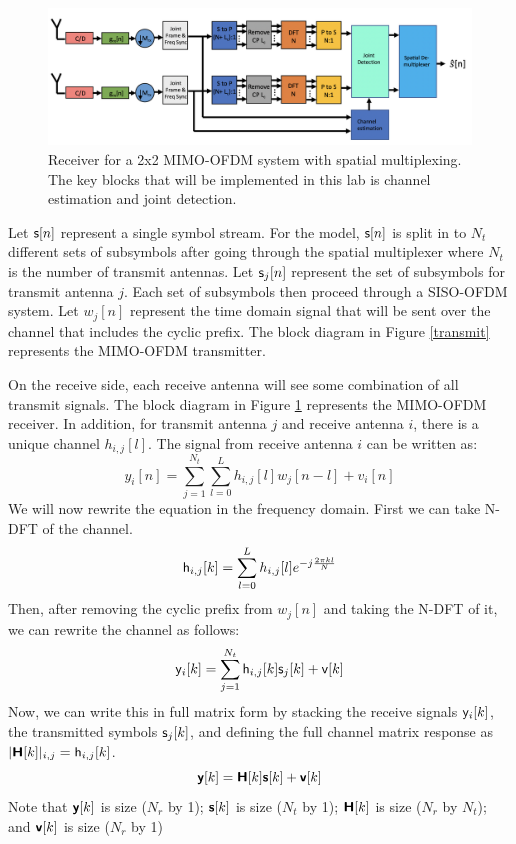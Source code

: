 \documentclass{book}
\begin{document}
\begin{figure}
\begin{center}
\includegraphics[width=\columnwidth]{lab11/figure3.png}
\caption{Receiver for a 2x2 MIMO-OFDM system with spatial multiplexing. The key blocks that will be implemented in this lab is channel estimation and joint detection.} \label{receive}
\end{center} 
\end{figure}

Let ${\mathsf{s}}[n]$ represent a single symbol stream. For the model, ${\mathsf{s}}[n]$ is split in to $N_t$ different sets of subsymbols after going through the spatial multiplexer where $N_t$ is the number of transmit antennas. Let ${\mathsf{s}}_j[n]$ represent the set of subsymbols for transmit antenna $j$. Each set of subsymbols then proceed through a SISO-OFDM system. Let $w_j[n]$ represent the time domain signal that will be sent over the channel that includes the cyclic prefix. The block diagram in Figure \ref{transmit} represents the MIMO-OFDM transmitter.

On the receive side, each receive antenna will see some combination of all transmit signals. The block diagram in Figure \ref{receive} represents the MIMO-OFDM receiver. In addition, for transmit antenna $j$ and receive antenna $i$, there is a unique channel $h_{i,j}[l]$. The signal from receive antenna $i$ can be written as:
\begin{equation}
    y_i[n] = \sum_{j=1}^{N_t}\sum_{l=0}^{L} h_{i,j}[l]w_j[n-l] + v_i[n]
\end{equation}
We will now rewrite the equation in the frequency domain. First we can take N-DFT of the channel.
\begin{equation}
    {\mathsf{h}}_{i,j}[k] = \sum_{l=0}^L h_{i,j}[l]e^{-j\frac{2\pi kl}{N}}
\end{equation}
Then, after removing the cyclic prefix from $w_j[n]$ and taking the N-DFT of it, we can rewrite the channel as follows:
\begin{equation}
    {\mathsf{y}}_i[k] = \sum_{j=1}^{N_t} {\mathsf{h}}_{i,j}[k]{\mathsf{s}}_j[k] + {\mathsf{v}}[k]
\end{equation}
Now, we can write this in full matrix form by stacking the receive signals ${\mathsf{y}}_i[k]$, the transmitted symbols ${\mathsf{s}}_j[k]$, and defining the full channel matrix response as $|\bm{\mathsf{H}}[k]|_{i,j} ={\mathsf{h}}_{i,j}[k]$.
\begin{equation}
    {\bm{\mathsf{y}}}[k] = \bm{\mathsf{H}}[k]{\bm{\mathsf{s}}}[k] + {\bm{\mathsf{v}}}[k]
\end{equation}
Note that ${\bm{\mathsf{y}}}[k]$ is size ($N_r$ by 1); ${\bm{\mathsf{s}}}[k]$ is size ($N_t$ by 1); $\bm{\mathsf{H}}[k]$ is size ($N_r$ by $N_t$); and ${\bm{\mathsf{v}}}[k]$ is size ($N_r$ by 1)
\end{document}
